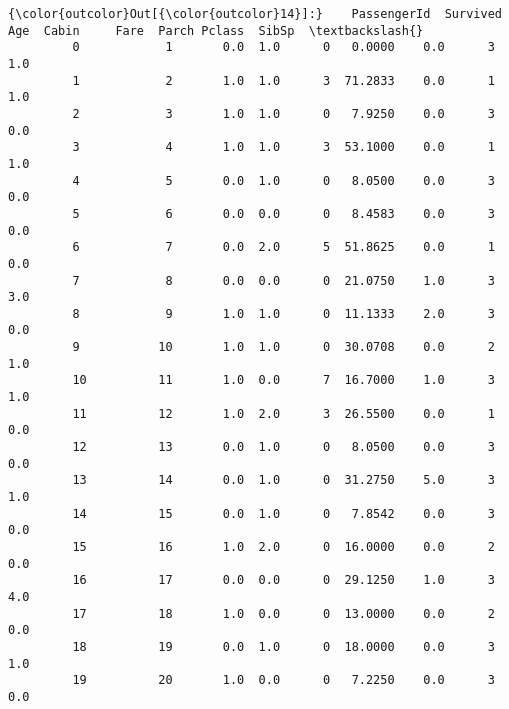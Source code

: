 \documentclass[11pt]{article}
\begin{document}
\begin{Verbatim}[commandchars=\\\{\}]
{\color{outcolor}Out[{\color{outcolor}14}]:}    PassengerId  Survived  Age  Cabin     Fare  Parch Pclass  SibSp  \textbackslash{}
         0            1       0.0  1.0      0   0.0000    0.0      3    1.0   
         1            2       1.0  1.0      3  71.2833    0.0      1    1.0   
         2            3       1.0  1.0      0   7.9250    0.0      3    0.0   
         3            4       1.0  1.0      3  53.1000    0.0      1    1.0   
         4            5       0.0  1.0      0   8.0500    0.0      3    0.0   
         5            6       0.0  0.0      0   8.4583    0.0      3    0.0   
         6            7       0.0  2.0      5  51.8625    0.0      1    0.0   
         7            8       0.0  0.0      0  21.0750    1.0      3    3.0   
         8            9       1.0  1.0      0  11.1333    2.0      3    0.0   
         9           10       1.0  1.0      0  30.0708    0.0      2    1.0   
         10          11       1.0  0.0      7  16.7000    1.0      3    1.0   
         11          12       1.0  2.0      3  26.5500    0.0      1    0.0   
         12          13       0.0  1.0      0   8.0500    0.0      3    0.0   
         13          14       0.0  1.0      0  31.2750    5.0      3    1.0   
         14          15       0.0  1.0      0   7.8542    0.0      3    0.0   
         15          16       1.0  2.0      0  16.0000    0.0      2    0.0   
         16          17       0.0  0.0      0  29.1250    1.0      3    4.0   
         17          18       1.0  0.0      0  13.0000    0.0      2    0.0   
         18          19       0.0  1.0      0  18.0000    0.0      3    1.0   
         19          20       1.0  0.0      0   7.2250    0.0      3    0.0   
         

\end{Verbatim}
\end{document}
